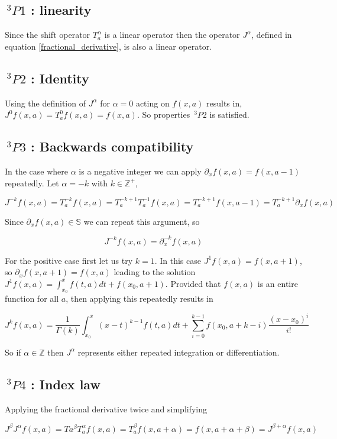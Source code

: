 \documentclass[%
 onecolumn,
 amsmath, amssymb, aps, pra, 10pt
]{revtex4-2}
\begin{document}
\subsection*{$\,^3P1$ : linearity}
Since the shift operator $T_{a}^{\alpha}$ is a linear operator then the operator $J^{\alpha}$, defined in equation \eqref{fractional_derivative}, is also a linear operator.

\subsection*{$\,^3P2$ : Identity}
Using the definition of $J^{\alpha}$ for $\alpha=0$ acting on $f(x, a)$ results in, $J^{0}f(x, a) = T_{a}^{0}f(x, a) = f(x, a)$. So properties $\,^3P2$ is satisfied.

\subsection*{$\,^3P3$ : Backwards compatibility}
In the case where $\alpha$ is a negative integer we can apply $\partial_x f(x, a) = f(x, a - 1)$ repeatedly. Let $\alpha = -k$ with $k \in \mathbb{Z}^+$,

$$J^{-k} f(x, a) = T_{a}^{-k} f(x, a)=T_{a}^{-k + 1}T_{a}^{-1} f(x, a) = T_{a}^{-k + 1}f(x, a - 1) = T_{a}^{-k + 1}\partial_x f(x, a)$$

Since $\partial_x f(x, a) \in \mathbb{S}$ we can repeat this argument, so

$$J^{-k} f(x, a) = \partial_{x}^{-k} f(x, a)$$

For the positive case first let us try $k=1$. In this case $J^{1} f(x, a) = f(x, a + 1)$, so $\partial_x f(x, a + 1) = f(x, a)$ leading to the solution $J^{1} f(x, a) = \int_{x_0}^{x} f(t, a)dt + f(x_0, a + 1)$. Provided that $f(x, a)$ is an entire function for all $a$, then applying this repeatedly results in

$$J^{k} f(x, a) = \frac{1}{\Gamma(k)}\int_{x_0}^{x} (x - t)^{k - 1}f(t, a)dt + \sum_{i = 0}^{k - 1}f(x_0, a + k - i)\frac{(x - x_0)^i}{i!}$$

So if $\alpha \in \mathbb{Z}$ then $J^{\alpha}$ represents either repeated integration or differentiation.

\subsection*{$\,^3P4$ : Index law}
Applying the fractional derivative twice and simplifying

$$J^{\beta}J^{\alpha} f(x, a) = T{a}^{\beta}T_{a}^{\alpha} f(x, a) = T_{a}^{\beta} f(x, a + \alpha) = f(x, a + \alpha + \beta) = J^{\beta + \alpha} f(x, a)$$
\end{document}
